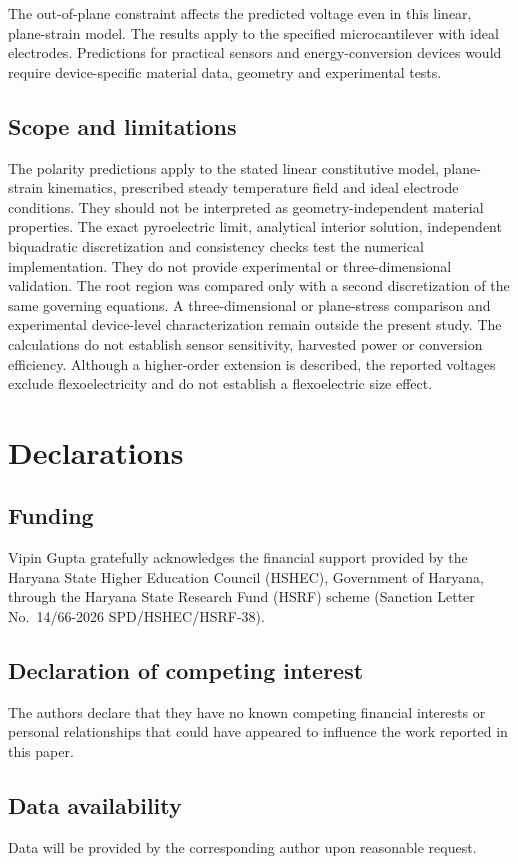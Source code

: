 \documentclass[a4paper,12pt]{elsarticle}
\begin{document}
The out-of-plane constraint affects the predicted voltage even in this
linear, plane-strain model. The results apply to the specified microcantilever with ideal electrodes.
Predictions for practical sensors and energy-conversion devices would require
device-specific material data, geometry and experimental tests.


\subsection*{Scope and limitations}
The polarity predictions apply to the stated linear constitutive model,
plane-strain kinematics, prescribed steady temperature field and ideal electrode
conditions. They should not be interpreted as geometry-independent material
properties. The exact pyroelectric limit, analytical interior solution, independent
biquadratic discretization and consistency checks test the numerical
implementation. They do not provide experimental or three-dimensional
validation. The root region was compared only with a second discretization
of the same governing equations. A three-dimensional or plane-stress comparison and
experimental device-level characterization remain outside the present study.
The calculations do not establish sensor sensitivity, harvested power or conversion
efficiency. Although a higher-order extension is described, the reported voltages
exclude flexoelectricity and do not establish a flexoelectric size effect.


\section*{Declarations}
\subsection*{Funding}
Vipin Gupta gratefully acknowledges the financial support provided by the Haryana
State Higher Education Council (HSHEC), Government of Haryana, through the Haryana
State Research Fund (HSRF) scheme (Sanction Letter
No.~14/66-2026 SPD/HSHEC/HSRF-38).
\subsection*{Declaration of competing interest}
The authors declare that they have no known competing financial interests or personal relationships that could have appeared to influence the work reported in this paper.
\subsection*{Data availability}
Data will be provided by the corresponding author upon reasonable request.




\end{document}
